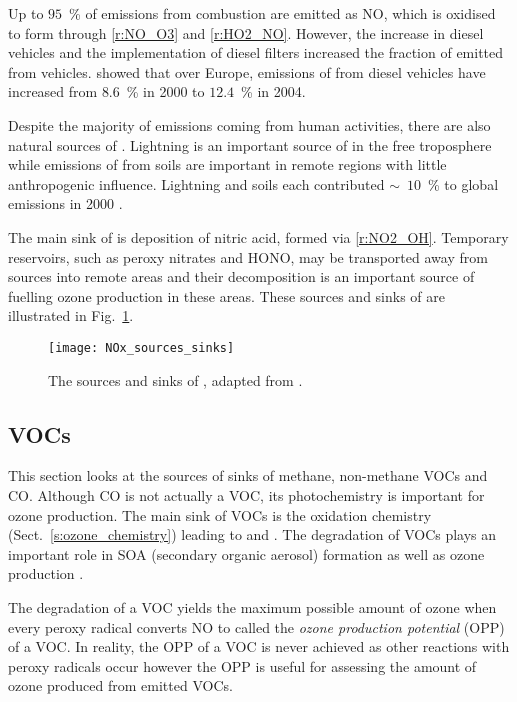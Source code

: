 Up to $95$~\% of  emissions from combustion are emitted as NO, which is oxidised to form  through \eqref{r:NO_O3} and \eqref{r:HO2_NO}.
However, the increase in diesel vehicles and the implementation of diesel filters increased the fraction of emitted  from vehicles.
\citet{Grice:2009} showed that over Europe, emissions of  from diesel vehicles have increased from $8.6$~\% in 2000 to $12.4$~\% in 2004.

Despite the majority of  emissions coming from human activities, there are also natural sources of .
Lightning is an important source of  in the free troposphere while emissions of  from soils are important in remote regions with little anthropogenic influence.
Lightning and soils each contributed $\sim$~$10$~\% to global  emissions in 2000 \citep{Seinfeld:2006}.

The main sink of  is deposition of nitric acid, formed via \eqref{r:NO2_OH}.
Temporary reservoirs, such as peroxy nitrates and HONO, may be transported away from sources into remote areas and their decomposition is an important source of  fuelling ozone production in these areas.
These sources and sinks of  are illustrated in Fig.~\ref{f:NOx_sources_sinks}.
\begin{figure}[t]%
	\begin{center}%
        \caption[ sources and sinks]{The sources and sinks of , adapted from \citet{Seinfeld:2006}.}%
        \texttt{[image: NOx\_sources\_sinks]}%
        \label{f:NOx_sources_sinks}%
	\end{center}%
\end{figure}%

\subsection{VOCs}
This section looks at the sources of sinks of methane, non-methane VOCs and CO.
Although CO is not actually a VOC, its photochemistry is important for ozone production.
The main sink of VOCs is the oxidation chemistry (Sect.~\ref{s:ozone_chemistry}) leading to  and .
The degradation of VOCs plays an important role in SOA (secondary organic aerosol) formation as well as ozone production \citep{Hallquist:2009}.

The degradation of a VOC yields the maximum possible amount of ozone when every peroxy radical converts NO to  called the \emph{ozone production potential} (OPP) of a VOC.
In reality, the OPP of a VOC is never achieved as other reactions with peroxy radicals occur however the OPP is useful for assessing the amount of ozone produced from emitted VOCs.

